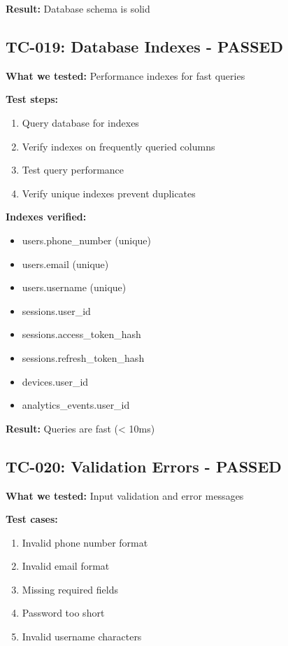 \documentclass[11pt,a4paper]{article}
\begin{document}
\textbf{Result:} Database schema is solid

\subsection{TC-019: Database Indexes - PASSED}
\textbf{What we tested:} Performance indexes for fast queries

\textbf{Test steps:}
\begin{enumerate}
    \item Query database for indexes
    \item Verify indexes on frequently queried columns
    \item Test query performance
    \item Verify unique indexes prevent duplicates
\end{enumerate}

\textbf{Indexes verified:}
\begin{itemize}
    \item users.phone\_number (unique)
    \item users.email (unique)
    \item users.username (unique)
    \item sessions.user\_id
    \item sessions.access\_token\_hash
    \item sessions.refresh\_token\_hash
    \item devices.user\_id
    \item analytics\_events.user\_id
\end{itemize}

\textbf{Result:} Queries are fast (< 10ms)

\subsection{TC-020: Validation Errors - PASSED}
\textbf{What we tested:} Input validation and error messages

\textbf{Test cases:}
\begin{enumerate}
    \item Invalid phone number format
    \item Invalid email format
    \item Missing required fields
    \item Password too short
    \item Invalid username characters
\end{enumerate}
\end{document}
